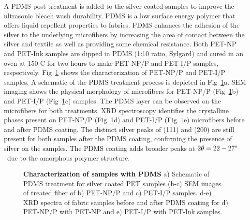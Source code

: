 \documentclass[10pt,letterpaper]{article}
\begin{document}
A PDMS post treatment is added to the silver coated samples to improve the ultrasonic bleach wash durability. PDMS is a low surface energy polymer that offers liquid repellent properties to fabrics.\cite{ye_2018} 
PDMS enhances the adhesion of the silver to the underlying microfibers by increasing the area of contact between the silver and textile as well as providing some chemical resistance.  
Both PET-NP and PET-Ink samples are dipped in PDMS (1:10 ratio, Sylgard) and cured in an oven at 150 \degree C for two hours to make PET-NP/P and PET-I/P samples, respectively. 
Fig~\ref{fig3} shows the characterization of PET-NP/P and PET-I/P samples. A schematic of the  PDMS treatment process is depicted in Fig~\ref{fig3}a.
SEM imaging shows the physical morphology of microfibers for PET-NP/P (Fig~\ref{fig3}b) and PET-I/P (Fig~\ref{fig3}c) samples. The PDMS layer can be observed on the microfibers for both treatments. 
XRD spectroscopy identifies the crystalline phases present on PET-NP/P (Fig~\ref{fig3}d) and PET-I/P (Fig~\ref{fig3}e) microfibers before and after PDMS coating. The distinct silver peaks of (111) and (200) are still present for both samples after the PDMS coating, confirming the presence of silver on the samples. The PDMS coating adds broader peaks at $2\theta = 22-27\degree$~due to the amorphous polymer structure. 

\begin{figure}[!h]
\caption{{\bf Characterization of samples with PDMS}{
a) Schematic of PDMS treatment for silver coated PET samples (b-c) SEM images of treated fiber of b) PET-NP/P and c) PET-I/P samples. d-e) XRD spectra of fabric samples before and after PDMS coating for d) PET-NP/P with PET-NP and e) PET-I/P with PET-Ink samples.}}
\label{fig3}
\end{figure}
\end{document}
